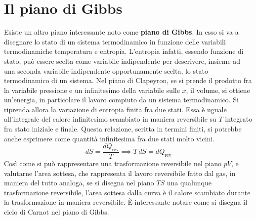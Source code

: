 \documentclass[10pt,a4paper]{book}
\begin{document}
\section{Il piano di Gibbs}

Esiste un altro piano interessante noto come \textbf{piano di Gibbs}. In esso si va a disegnare lo stato di un sistema termodinamico in funzione delle variabili termodinamiche temperatura e entropia. L'entropia infatti, essendo funzione di stato, può essere scelta come variabile indipendente per descrivere, insieme ad una seconda variabile indipendente opportunamente scelta, lo stato termodinamico di un sistema. Nel piano di Clapeyron, se si prende il prodotto fra la variabile pressione e un infinitesimo della variabile sulle $x$, il volume, si ottiene un'energia, in particolare il lavoro compiuto da un sistema termodinamico.
Si riprenda allora la variazione di entropia finita fra due stati. Essa è uguale all'integrale del calore infinitesimo scambiato in maniera reversibile su $T$ integrato fra stato iniziale e finale. Questa relazione, scritta in termini finiti, si potrebbe anche esprimere come quantità infinitesima fra due stati molto vicini.
\[
	dS = \frac{dQ_{\text{rev} } }{T} \implies T\,dS = dQ_{\text{rev} }
\]
Così come si può rappresentare una trasformazione reversibile nel piano $pV$,  e valutarne l'area sottesa, che rappresenta il lavoro reversibile fatto dal gas, in maniera del tutto analoga, se si disegna nel piano $TS$ una qualunque trasformazione reversibile, l'area sottesa dalla curva è il calore scambiato durante la trasformazione in maniera reversibile. È interessante notare come si disegna il ciclo di Carnot nel piano di Gibbs.
\end{document}
